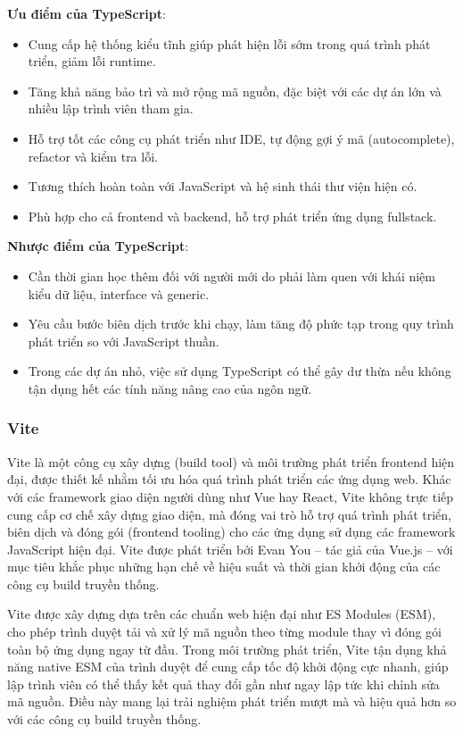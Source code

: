 \textbf{Ưu điểm của TypeScript}:
\begin{itemize}
    \item Cung cấp hệ thống kiểu tĩnh giúp phát hiện lỗi sớm trong quá trình phát 
    triển, giảm lỗi runtime.
    \item Tăng khả năng bảo trì và mở rộng mã nguồn, đặc biệt với các dự án lớn và 
    nhiều lập trình viên tham gia.
    \item Hỗ trợ tốt các công cụ phát triển như IDE, tự động gợi ý mã (autocomplete), 
    refactor và kiểm tra lỗi.
    \item Tương thích hoàn toàn với JavaScript và hệ sinh thái thư viện hiện có.
    \item Phù hợp cho cả frontend và backend, hỗ trợ phát triển ứng dụng fullstack.
\end{itemize}

\textbf{Nhược điểm của TypeScript}:
\begin{itemize}
    \item Cần thời gian học thêm đối với người mới do phải làm quen với khái niệm 
    kiểu dữ liệu, interface và generic.
    \item Yêu cầu bước biên dịch trước khi chạy, làm tăng độ phức tạp trong quy 
    trình phát triển so với JavaScript thuần.
    \item Trong các dự án nhỏ, việc sử dụng TypeScript có thể gây dư thừa nếu không 
    tận dụng hết các tính năng nâng cao của ngôn ngữ.
\end{itemize}
\subsubsection{Vite}
Vite là một công cụ xây dựng (build tool) và môi trường phát triển frontend hiện đại, 
được thiết kế nhằm tối ưu hóa quá trình phát triển các ứng dụng web. Khác với các 
framework giao diện người dùng như Vue hay React, Vite không trực tiếp cung cấp cơ chế 
xây dựng giao diện, mà đóng vai trò hỗ trợ quá trình phát triển, biên dịch và đóng gói 
(frontend tooling) cho các ứng dụng sử dụng các framework JavaScript hiện đại. Vite 
được phát triển bởi Evan You – tác giả của Vue.js – với mục tiêu khắc phục những hạn 
chế về hiệu suất và thời gian khởi động của các công cụ build truyền thống.

Vite được xây dựng dựa trên các chuẩn web hiện đại như ES Modules (ESM), cho phép 
trình duyệt tải và xử lý mã nguồn theo từng module thay vì đóng gói toàn bộ ứng dụng 
ngay từ đầu. Trong môi trường phát triển, Vite tận dụng khả năng native ESM của trình 
duyệt để cung cấp tốc độ khởi động cực nhanh, giúp lập trình viên có thể thấy kết quả 
thay đổi gần như ngay lập tức khi chỉnh sửa mã nguồn. Điều này mang lại trải nghiệm 
phát triển mượt mà và hiệu quả hơn so với các công cụ build truyền thống.

